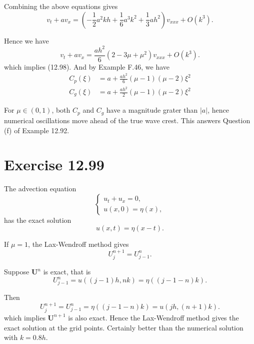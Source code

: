 \documentclass[twocolumn,10pt]{article}
\begin{document}
Combining the above equations gives
\begin{equation*}
    v_t+av_x=(-\frac{1}{2}a^2kh+\frac{1}{6}a^3k^2+\frac{1}{3}ah^2)v_{xxx}+O(k^3).
\end{equation*}

Hence we have
\begin{equation*}
    v_t+av_x=\frac{ah^2}{6}(2-3\mu+\mu^2)v_{xxx}+O(k^3).
\end{equation*}
which implies (12.98). And by Example F.46, we have
\begin{align*}
C_p(\xi) &= a+\frac{ah^2}{6}(\mu-1)(\mu-2)\xi^2\\
C_g(\xi) &= a+\frac{ah^2}{2}(\mu-1)(\mu-2)\xi^2
\end{align*}

For $\mu\in(0,1)$, both $C_p$ and $C_g$ have a magnitude grater than $|a|$, hence numerical oscillations move ahead of the true wave crest. This answers Question (f) of Example 12.92.

\section*{\large Exercise 12.99}

The advection equation
\begin{equation*}
    \left\{
        \begin{array}{l}
            u_t+u_x=0,\\
            u(x,0)=\eta(x),
        \end{array}
    \right.
\end{equation*}
has the exact solution
\begin{equation*}
    u(x,t)=\eta(x-t).
\end{equation*}

If $\mu=1$, the Lax-Wendroff method gives
\begin{equation*}
    U_j^{n+1}=U_{j-1}^n.
\end{equation*}

Suppose $\mathbf{U}^n$ is exact, that is
\begin{equation*}
    U_{j-1}^n=u((j-1)h,nk)=\eta((j-1-n)k).
\end{equation*}

Then
\begin{equation*}
    U_{j}^{n+1}=U_{j-1}^n=\eta((j-1-n)k)=u(jh,(n+1)k).
\end{equation*}
which implies $\mathbf{U}^{n+1}$ is also exact. Hence the Lax-Wendroff method gives the exact solution at the grid points. Certainly better than the numerical solution with $k=0.8h$.
\end{document}
